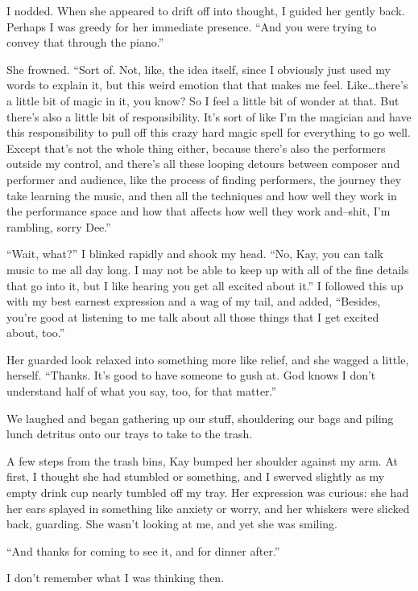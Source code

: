 I nodded. When she appeared to drift off into thought, I guided her gently back. Perhaps I was greedy for her immediate presence. ``And you were trying to convey that through the piano.''

She frowned. ``Sort of. Not, like, the idea itself, since I obviously just used my words to explain it, but this weird emotion that that makes me feel. Like\ldots there's a little bit of magic in it, you know? So I feel a little bit of wonder at that. But there's also a little bit of responsibility. It's sort of like I'm the magician and have this responsibility to pull off this crazy hard magic spell for everything to go well. Except that's not the whole thing either, because there's also the performers outside my control, and there's all these looping detours between composer and performer and audience, like the process of finding performers, the journey they take learning the music, and then all the techniques and how well they work in the performance space and how that affects how well they work and--shit, I'm rambling, sorry Dee.''

``Wait, what?'' I blinked rapidly and shook my head. ``No, Kay, you can talk music to me all day long. I may not be able to keep up with all of the fine details that go into it, but I like hearing you get all excited about it.'' I followed this up with my best earnest expression and a wag of my tail, and added, ``Besides, you're good at listening to me talk about all those things that I get excited about, too.''

Her guarded look relaxed into something more like relief, and she wagged a little, herself. ``Thanks. It's good to have someone to gush at. God knows I don't understand half of what you say, too, for that matter.''

We laughed and began gathering up our stuff, shouldering our bags and piling lunch detritus onto our trays to take to the trash.

A few steps from the trash bins, Kay bumped her shoulder against my arm. At first, I thought she had stumbled or something, and I swerved slightly as my empty drink cup nearly tumbled off my tray. Her expression was curious: she had her ears splayed in something like anxiety or worry, and her whiskers were slicked back, guarding. She wasn't looking at me, and yet she was smiling.

``And thanks for coming to see it, and for dinner after.''

I don't remember what I was thinking then.

